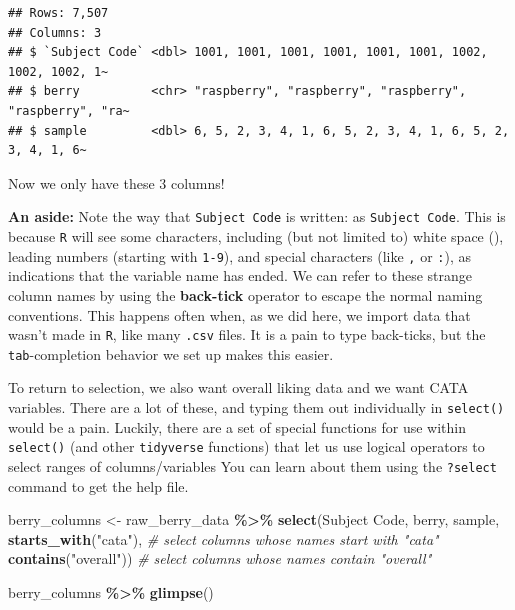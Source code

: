 \documentclass[
]{book}
\newenvironment{Shaded}{\begin{snugshade}}{\end{snugshade}}
\newcommand{\AttributeTok}[1]{\textcolor[rgb]{0.13,0.29,0.53}{#1}}
\newcommand{\CommentTok}[1]{\textcolor[rgb]{0.56,0.35,0.01}{\textit{#1}}}
\newcommand{\FunctionTok}[1]{\textcolor[rgb]{0.13,0.29,0.53}{\textbf{#1}}}
\newcommand{\NormalTok}[1]{#1}
\newcommand{\OtherTok}[1]{\textcolor[rgb]{0.56,0.35,0.01}{#1}}
\newcommand{\SpecialCharTok}[1]{\textcolor[rgb]{0.81,0.36,0.00}{\textbf{#1}}}
\newcommand{\StringTok}[1]{\textcolor[rgb]{0.31,0.60,0.02}{#1}}
\begin{document}
\begin{verbatim}
## Rows: 7,507
## Columns: 3
## $ `Subject Code` <dbl> 1001, 1001, 1001, 1001, 1001, 1001, 1002, 1002, 1002, 1~
## $ berry          <chr> "raspberry", "raspberry", "raspberry", "raspberry", "ra~
## $ sample         <dbl> 6, 5, 2, 3, 4, 1, 6, 5, 2, 3, 4, 1, 6, 5, 2, 3, 4, 1, 6~
\end{verbatim}

Now we only have these 3 columns!

\textbf{An aside:} Note the way that \texttt{Subject\ Code} is written: as \texttt{\textasciigrave{}Subject\ Code\textasciigrave{}}. This is because \texttt{R} will see some characters, including (but not limited to) white space (\texttt{}), leading numbers (starting with \texttt{1-9}), and special characters (like \texttt{,} or \texttt{:}), as indications that the variable name has ended. We can refer to these strange column names by using the \textbf{back-tick} operator \texttt{\textasciigrave{}} to escape the normal naming conventions. This happens often when, as we did here, we import data that wasn't made in \texttt{R}, like many \texttt{.csv} files. It is a pain to type back-ticks, but the \texttt{tab}-completion behavior we set up makes this easier.

To return to selection, we also want overall liking data and we want CATA variables. There are a lot of these, and typing them out individually in \texttt{select()} would be a pain. Luckily, there are a set of special functions for use within \texttt{select()} (and other \texttt{tidyverse} functions) that let us use logical operators to select ranges of columns/variables You can learn about them using the \texttt{?select} command to get the help file.

\begin{Shaded}
\begin{Highlighting}[]
\NormalTok{berry\_columns }\OtherTok{\textless{}{-}} 
\NormalTok{  raw\_berry\_data }\SpecialCharTok{\%\textgreater{}\%}
  \FunctionTok{select}\NormalTok{(}\StringTok{\textasciigrave{}}\AttributeTok{Subject Code}\StringTok{\textasciigrave{}}\NormalTok{,}
\NormalTok{         berry,}
\NormalTok{         sample,}
         \FunctionTok{starts\_with}\NormalTok{(}\StringTok{"cata"}\NormalTok{),    }\CommentTok{\# select columns whose names start with "cata"}
         \FunctionTok{contains}\NormalTok{(}\StringTok{"overall"}\NormalTok{))    }\CommentTok{\# select columns whose names contain "overall"}

\NormalTok{berry\_columns }\SpecialCharTok{\%\textgreater{}\%}
  \FunctionTok{glimpse}\NormalTok{()}
\end{Highlighting}
\end{Shaded}
\end{document}
